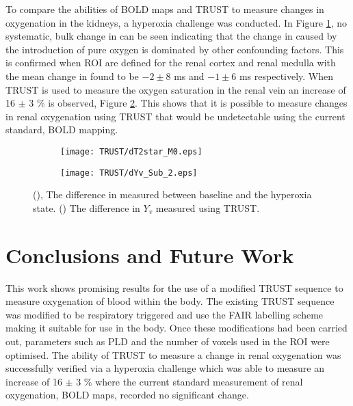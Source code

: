 To compare the abilities of \ac{BOLD} \ttwostar maps and \ac{TRUST} to measure changes in oxygenation in the kidneys, a hyperoxia challenge was conducted. In Figure \ref{fig:dT2star}, no systematic, bulk change in \ttwostar can be seen indicating that the change in \ttwostar caused by the introduction of pure oxygen is dominated by other confounding factors. This is confirmed when \ac{ROI} are defined for the renal cortex and renal medulla with the mean change in \ttwostar found to be $-2 \pm 8$ ms and $-1 \pm 6$ ms respectively. When \ac{TRUST} is used to measure the oxygen saturation in the renal vein an increase of 16 $\pm$ 3 \% is observed, Figure \ref{fig:dYv}. This shows that it is possible to measure changes in renal oxygenation using \ac{TRUST} that would be undetectable using the current standard, \ac{BOLD} \ttwostar mapping.
\begin{figure}[H]
	\centering
	\begin{subfigure}[c]{0.47\textwidth}
		\centering
		\texttt{[image: TRUST/dT2star\_M0.eps]}
		\caption{}
		\label{fig:dT2star}
	\end{subfigure}
	\hfill
	\begin{subfigure}[c]{0.47\textwidth}
		\centering
		\texttt{[image: TRUST/dYv\_Sub\_2.eps]}
		\caption{}
		\label{fig:dYv}
	\end{subfigure}
	\caption{(), The difference in \ttwostar measured between baseline and the hyperoxia state. () The difference in $Y_v$ measured using \ac{TRUST}.}
	\label{fig:oxygen_chalenge_results}
\end{figure}

\newpage
\section{Conclusions and Future Work}

This work shows promising results for the use of a modified \ac{TRUST} sequence to measure oxygenation of blood within the body. The existing \ac{TRUST} sequence was modified to be respiratory triggered and use the \ac{FAIR} labelling scheme making it suitable for use in the body. Once these modifications had been carried out, parameters such as \ac{PLD} and the number of voxels used in the \ac{ROI} were optimised. The ability of \ac{TRUST} to measure a change in renal oxygenation was successfully verified via a hyperoxia challenge which was able to measure an increase of 16 $\pm$ 3 \% where the current standard measurement of renal oxygenation, \ac{BOLD} \ttwostar maps, recorded no significant change.

